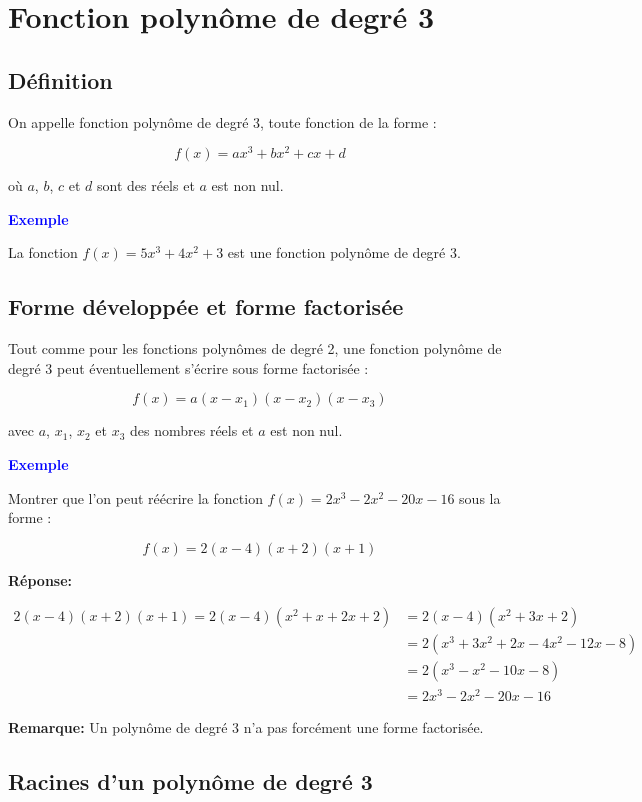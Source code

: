 \documentclass[a4paper,12pt]{article}
\begin{document}
\section*{Fonction polynôme de degré 3}

\subsection*{Définition}

On appelle fonction polynôme de degré 3, toute fonction de la forme :

\[
f(x) = ax^3 + bx^2 + cx + d
\]

où $a$, $b$, $c$ et $d$ sont des réels et $a$ est non nul.

\textbf{\textcolor{blue}{Exemple}} \par

La fonction $f(x) = 5x^3 + 4x^2 + 3$ est une fonction polynôme de degré 3.

\subsection*{Forme développée et forme factorisée}

Tout comme pour les fonctions polynômes de degré 2, une fonction polynôme de degré 3 peut éventuellement s'écrire sous forme factorisée :

\[
f(x) = a(x - x_1)(x - x_2)(x - x_3)
\]

avec $a$, $x_1$, $x_2$ et $x_3$ des nombres réels et $a$ est non nul.

\textbf{\textcolor{blue}{Exemple}} \par

Montrer que l’on peut réécrire la fonction $f(x) = 2x^3 - 2x^2 - 20x - 16$ sous la forme :

\[
f(x) = 2(x - 4)(x + 2)(x + 1)
\]

\textbf{Réponse:}

\begin{align}
  2(x - 4)(x + 2)(x + 1) = 2(x - 4)(x^2 + x + 2x + 2) &= 2(x - 4)(x^2 + 3x + 2) \\
  &= 2(x^3 + 3x^2 + 2x - 4x^2 - 12x - 8) \\
  &= 2(x^3 - x^2 - 10x - 8) \\
  &= 2x^3 - 2x^2 - 20x - 16
\end{align}

\textbf{Remarque:} Un polynôme de degré 3 n’a pas forcément une forme factorisée.

\subsection*{Racines d’un polynôme de degré 3}
\end{document}

